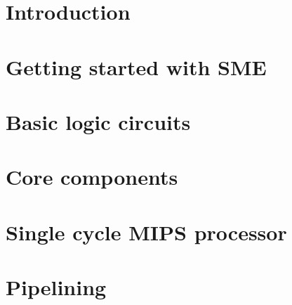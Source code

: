 \documentclass[a4paper]{article}
\begin{document}
\maketitle



\newpage
\tableofcontents
\newpage

\section{Introduction}


\newpage
\section{Getting started with SME}


\newpage
\section{Basic logic circuits}
\label{sec:logic-circuits}


\newpage
\section{Core components}


\newpage
\section{Single cycle MIPS processor}


\newpage
\section{Pipelining}


\newpage

\end{document}
